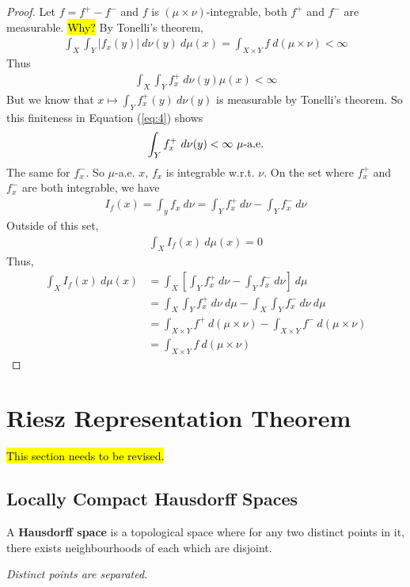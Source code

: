 \documentclass[11pt]{article}
\newcommand{\dmu}[0]{\ d\mu}
\begin{document}
\begin{theorem}
		\begin{proof}
			Let $f = f^+ - f^-$ and $f$ is $(\mu\times\nu)$-integrable, both $f^+$ and $f^-$ are measurable.
			\hl{Why?}
			By Tonelli's theorem,
			\begin{align}
				\int_X \int_Y |f_x(y)|\ d\nu(y) \dmu(x) = \int_{X \times Y} f\ d(\mu \times \nu) < \infty \label{eq:4}
			\end{align}
			Thus
			\begin{align}
				\int_X \int_Y f_x^+\ d\nu(y)\mu(x) < \infty
			\end{align}
			But we know that $x \mapsto \int_Y f_x^+(y)\ d\nu(y)$ is measurable by Tonelli's theorem. So this finiteness in Equation (\ref{eq:4}) shows
			\begin{align}
				\int_Y f_x^+\ d\nu(y) < \infty \text{{ $\mu$-a.e.}}
			\end{align}
			The same for $f_x^-$. So $\mu$-a.e. $x$, $f_x$ is integrable w.r.t. $\nu$.
			On the set where $f_x^+$ and $f_x^-$ are both integrable, we have
			\begin{align}
				I_f(x) = \int_y f_x\ d\nu = \int_Y f_x^+\ d\nu - \int_Y f_x^-\ d\nu
			\end{align}
			Outside of this set,
			\begin{align}
				\int_X I_f(x)\dmu(x) = 0
			\end{align}
			Thus,
			\begin{align}
				\int_X I_f(x)\dmu(x) 
				&= \int_X \left[\int_Y f_x^+\ d\nu - \int_Y f_x^-\ d\nu \right]\dmu \\
				&= \int_X \int_Y f_x^+\ d\nu\dmu - \int_X \int_Y f_x^-\ d\nu \dmu \\
				&= \int_{X \times Y} f^+\ d(\mu\times \nu) - \int_{X \times Y} f^-\ d(\mu\times \nu) \\
				&= \int_{X \times Y} f\ d(\mu\times \nu)
			\end{align}
		\end{proof}
	\end{theorem}
	
	\newpage
	\section{Riesz Representation Theorem}
	\hl{This section needs to be revised.}
	\subsection{Locally Compact Hausdorff Spaces}
	\begin{definition}
		A \textbf{Hausdorff space} is a topological space where for any two distinct points in it, there exists neighbourhoods of each which are disjoint.
		
		\emph{Distinct points are separated.}
	\end{definition}
	
\end{document}
